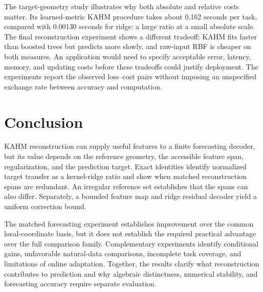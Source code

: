 The target-geometry study illustrates why both absolute and relative costs
matter. Its learned-metric KAHM procedure takes about 0.162 seconds per
task, compared with 0.00130 seconds for ridge: a large ratio at a small
absolute scale. The final reconstruction experiment shows a different
tradeoff: KAHM fits faster than boosted trees but predicts more slowly,
and raw-input RBF is cheaper on both measures. An application would need
to specify acceptable error, latency, memory, and updating costs before
these tradeoffs could justify deployment. The experiments report the
observed loss--cost pairs without imposing an unspecified exchange rate
between accuracy and computation.

\section{Conclusion}
KAHM reconstruction can supply useful features to a finite forecasting
decoder, but its value depends on the reference geometry, the accessible
feature span, regularization, and the prediction target. Exact identities
identify normalized target transfer as a kernel-ridge ratio and show
when matched reconstruction spans are redundant. An irregular reference
set establishes that the spans can also differ. Separately, a bounded
feature map and ridge residual decoder yield a uniform correction bound.

The matched forecasting experiment establishes improvement over the
common local-coordinate basis, but it does not establish the required
practical advantage over the full comparison family. Complementary
experiments identify conditional gains, unfavorable natural-data
comparisons, incomplete task coverage, and limitations of online
adaptation. Together, the results clarify what reconstruction contributes
to prediction and why algebraic distinctness, numerical stability, and
forecasting accuracy require separate evaluation.
